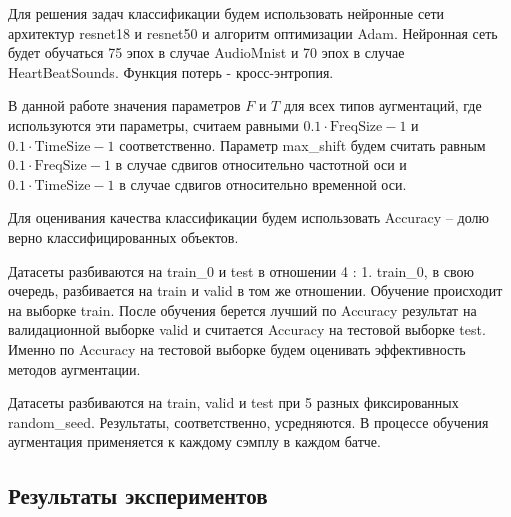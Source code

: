 \documentclass[12pt, fleqn]{article}
\begin{document}
	Для решения задач классификации будем использовать нейронные сети архитектур resnet18 и resnet50 и алгоритм оптимизации Adam. Нейронная сеть будет обучаться 75 эпох в случае AudioMnist и 70 эпох в случае HeartBeatSounds. Функция потерь - кросс-энтропия. 
	
	В данной работе значения параметров $F$ и $T$ для всех типов аугментаций, где используются эти параметры, считаем равными $0.1 \cdot \text{FreqSize} - 1$ и $0.1 \cdot \text{TimeSize} - 1$ соответственно. Параметр max\_shift будем считать равным $0.1 \cdot \text{FreqSize} - 1$ в случае сдвигов относительно частотной оси и  $0.1 \cdot \text{TimeSize} - 1$ в случае сдвигов относительно временной оси.
	
	Для оценивания качества классификации будем использовать Accuracy -- долю верно классифицированных объектов.
	
	Датасеты разбиваются на train\_0 и test в отношении 4 : 1. train\_0, в свою очередь, разбивается на train и valid в том же отношении. Обучение происходит на выборке train. После обучения берется лучший по Accuracy результат на валидационной выборке valid и считается Accuracy на тестовой выборке test. Именно по Accuracy на тестовой выборке будем оценивать эффективность методов аугментации.
	
	Датасеты разбиваются на train, valid и test при 5 разных фиксированных random\_seed. Результаты, соответственно, усредняются. В процессе обучения аугментация применяется к каждому сэмплу в каждом батче.
	\subsection{Результаты экспериментов}
	
\end{document}
